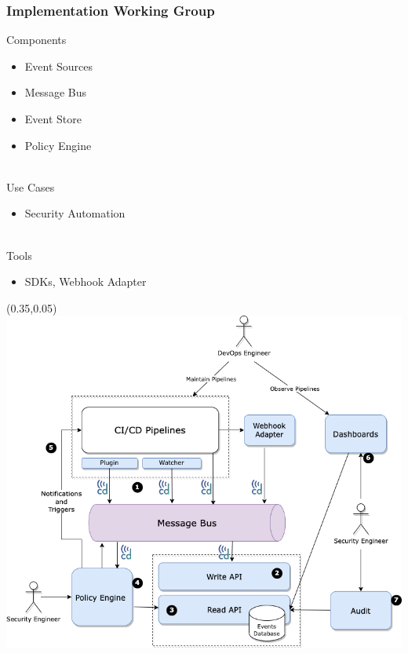 \documentclass[aspectratio=169,11pt,hyperref={colorlinks=true}]{beamer}
\begin{document}
\begin{grayframe}
  \frametitle{Implementation Working Group}
  Components
  \begin{itemize}
    \item Event Sources
    \item Message Bus
    \item Event Store
    \item Policy Engine
  \end{itemize}
  ~\\
  Use Cases
  \begin{itemize}
    \item Security Automation
  \end{itemize}
  ~\\
  Tools
  \begin{itemize}
    \item SDKs, Webhook Adapter
  \end{itemize}
  \begin{textblock*}{0.56\paperwidth}(0.35\paperwidth,0.05\paperheight)
    \includegraphics[width=0.56\paperwidth]{img/cdevents-implementation-wg.png}
  \end{textblock*}
\end{grayframe}
\end{document}
